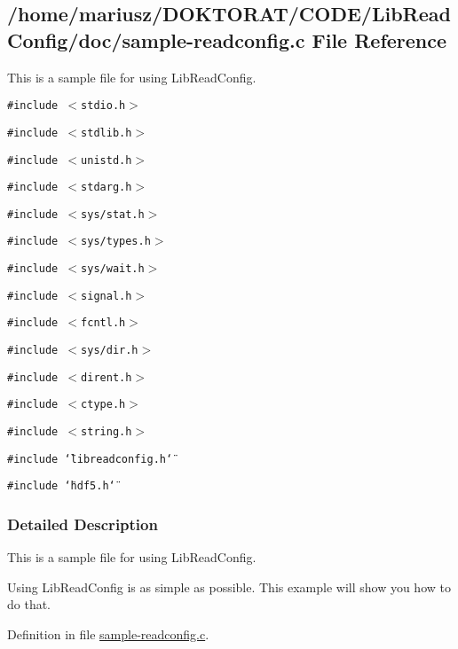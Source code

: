 \hypertarget{sample-readconfig_8c}{
\subsection{/home/mariusz/DOKTORAT/CODE/LibReadConfig/doc/sample-readconfig.c File Reference}
\label{sample-readconfig_8c}
}
This is a sample file for using LibReadConfig.  


{\tt \#include $<$stdio.h$>$}\par
{\tt \#include $<$stdlib.h$>$}\par
{\tt \#include $<$unistd.h$>$}\par
{\tt \#include $<$stdarg.h$>$}\par
{\tt \#include $<$sys/stat.h$>$}\par
{\tt \#include $<$sys/types.h$>$}\par
{\tt \#include $<$sys/wait.h$>$}\par
{\tt \#include $<$signal.h$>$}\par
{\tt \#include $<$fcntl.h$>$}\par
{\tt \#include $<$sys/dir.h$>$}\par
{\tt \#include $<$dirent.h$>$}\par
{\tt \#include $<$ctype.h$>$}\par
{\tt \#include $<$string.h$>$}\par
{\tt \#include \char`\"{}libreadconfig.h\char`\"{}}\par
{\tt \#include \char`\"{}hdf5.h\char`\"{}}\par


\subsubsection{Detailed Description}
This is a sample file for using LibReadConfig. 

Using LibReadConfig is as simple as possible. This example will show you how to do that. 

Definition in file \hyperlink{sample-readconfig_8c-source}{sample-readconfig.c}.